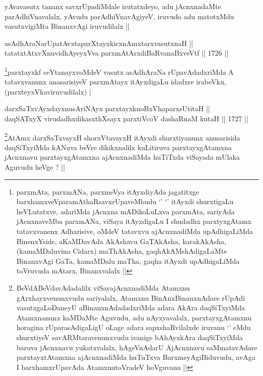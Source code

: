 \begin{artha}
yAvavasutx tananx savxrUpadiMdale irutatxdeyo, adu jAcnxnadaMte
parAdhiVnavalalx, yAvudu parAdhiVnavAgiyeV, iruvudo adu matotxMdu
vasutxvigiMta BinanxvAgi iruvudilalx ||
\end{artha}


\begin{shl}
asAdhAraNarUpatAvxtapxrXtayxkicxnAmxtarxvasutxnaH || \\
tatatxtAtxvXnuvidhAyeyxVva parxmAtArxdiBaRvanaBxveVtf ||  1726 ||  
\end{shl}

\begin{artha}
\footnote[1]{parxmAta, parxmANa, parxmeVya itAyxdiyAda jagatitxge
  barxhamxveVparamAthaRsavxrUpaveMbudu `\stext' `\stext' itAyxdi
  shurxtigaLu heVLutatxve, adariMda jAcnxna mADikoLuLxva parxmAta,
  sariyAda jAcnxnaveMba parxmANa, viSaya itAyxdigaLu I shudadhx
  parxtyxgAtamx tatavxvanenx Adharisive, oMdeV tatavxvu ajAcnxnadiMda
  upAdhigaLiMda BinenxYside, aKaMDavAda AkAshavu GaTAkAsha,
  karakAkAsha, (kamaMDaluvina Cidarx) maThAkAsha, gaqhAkAMshAdigaLaMte
  BinanxvAgi GaTa, kamaMDalu maTha, gaqha itAyxdi upAdhigaLiMda
  toVruvuda mAtarx, Binanxvalalx ||}parxtayxkf ceYtanayxvoMdeV vasutx asAdhAraNa
rUpavAdadxriMda A tatavxvanunx anasarisiyeV parxmAtayx itAyxdigaLu
idadxre irabeVku, (parxteyxVkaviruvudilalx) |
\end{artha}


\begin{shl}
darxSaTxvAyxdayxnusAriNAyx parxtayxknoBxVhaparxsUtitaH || \\
daqSATxyX virudadhxdikasxthXsayx parxtiVcoV dashaRnaM kutaH ||  1727 ||  
\end{shl}

\begin{artha}
\footnote[2]{BeVdABeVdavAdadalilx viSayajAcnxnadiMda Atamxnu
  gArxhayxvenunxvudu sariyalalx, Atamxnu BinAnxBinanxnAdare rUpAdi
  vasutxgaLoDaneyU aBinanxnAdadadxriMda adara AkAra daqSiTxyiMda
  Atamxnanunx kaMDaMte Aguvudu, adu nAyxyavalalx, parxtayxgAtamxnu
  horagina rUparasAdigaLigU oLage adara sapxshaRvilalxde iruvanu
  `\stext' eMdu shurxtiyeV savARMtaravenunxvudu ivanige bAhAyxkAra
  daqSiTxyiMda baruva jAcnxnavu yukatxvalalx, hAgeVnAdarU AjAcnxnavu
  saMmatavAdare parxtayxtAtamxna ajAcnxnadiMda huTuTxva
  BarxmeyAgiBiduvudu, avAga I barxhamxrUpavAda AtamxnutoVradeV
  hoVguvanu ||}AtAmx darxSaTxvayxH shorxVtavayxH itAyxdi shurxtiyanunx
anusarisida daqSiTxyiMda kANuva beVre dikikxnalilx kuLitiruva
parxtayxgAtamxna jAcnxnavu parxtayxgAtamxna ajAcnxnadiMda huTiTxda
viSayada mUlaka Aguvudu heVge ? ||
\end{artha}

